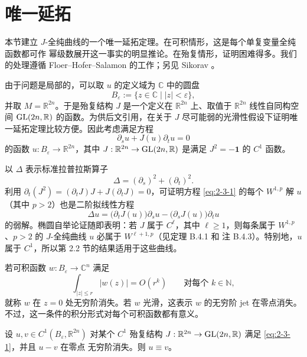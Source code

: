 
\section{唯一延拓}\label{sec:2-3}

本节建立 $J$-全纯曲线的一个唯一延拓定理。在可积情形，这是每个单复变量全纯函数都可作
幂级数展开这一事实的明显推论。在殆复情形，证明困难得多。我们的处理遵循
Floer--Hofer--Salamon  的工作；另见 Sikorav 。

由于问题是局部的，可以取 $u$ 的定义域为 $\mathbb C$ 中的圆盘
\[
  B_\varepsilon:=\{z\in\mathbb C\mid |z|<\varepsilon\},
\]
并取 $M=\mathbb R^{2n}$。于是殆复结构 $J$ 是一个定义在 $\mathbb R^{2n}$ 上、取值于
$\mathbb R^{2n}$ 线性自同构空间 $\operatorname{GL}(2n,\mathbb R)$ 的函数。为供后文引用，在关于 $J$
尽可能弱的光滑性假设下证明唯一延拓定理比较方便。因此考虑满足方程
\begin{equation}\label{eq:2-3-1}
  \partial_su+J(u)\partial_tu=0
\end{equation}
的函数 $u:B_\varepsilon\to\mathbb R^{2n}$，其中
$J:\mathbb R^{2n}\to\operatorname{GL}(2n,\mathbb R)$ 是满足 $J^2=-\mathbf1$ 的 $C^1$ 函数。

\begin{remark}\label{rem:2-3-1}
以 $\Delta$ 表示标准拉普拉斯算子
\[
  \Delta=(\partial_s)^2+(\partial_t)^2.
\]
利用
$\partial_t(J^2)=(\partial_tJ)J+J(\partial_tJ)=0$，可证明方程
\eqref{eq:2-3-1} 的每个 $W^{1,p}$ 解 $u$（其中 $p>2$）也是二阶拟线性方程
\begin{equation}\label{eq:2-3-2}
  \Delta u=\bigl(\partial_tJ(u)\bigr)\partial_su
  -\bigl(\partial_sJ(u)\bigr)\partial_tu
\end{equation}
的弱解。椭圆自举论证随即表明：若 $J$ 属于 $C^\ell$，其中 $\ell\ge1$，则每条属于
$W^{1,p}$、$p>2$ 的 $J$-全纯曲线 $u$ 必属于 $W^{\ell+1,p}$（见定理 B.4.1 和
注 B.4.3）。特别地，$u$ 属于 $C^1$，所以第 2.2 节的结果适用于这些曲线。
\end{remark}

若可积函数 $w:B_\varepsilon\to\mathbb C^n$ 满足
\[
  \int_{|z|\le r}|w(z)|=O(r^k)
  \qquad\text{对每个 }k\in\mathbb N,
\]
就称 $w$ 在 $z=0$ 处无穷阶消失。若 $w$ 光滑，这表示 $w$ 的无穷阶 jet 在零点消失。
不过，这一条件的积分形式对每个可积函数都有意义。

\begin{theorem}\label{thm:2-3-2}
设 $u,v\in C^1(B_\varepsilon,\mathbb R^{2n})$ 对某个 $C^1$ 殆复结构
$J:\mathbb R^{2n}\to\operatorname{GL}(2n,\mathbb R)$ 满足 \eqref{eq:2-3-1}，并且 $u-v$ 在零点
无穷阶消失。则 $u\equiv v$。
\end{theorem}

